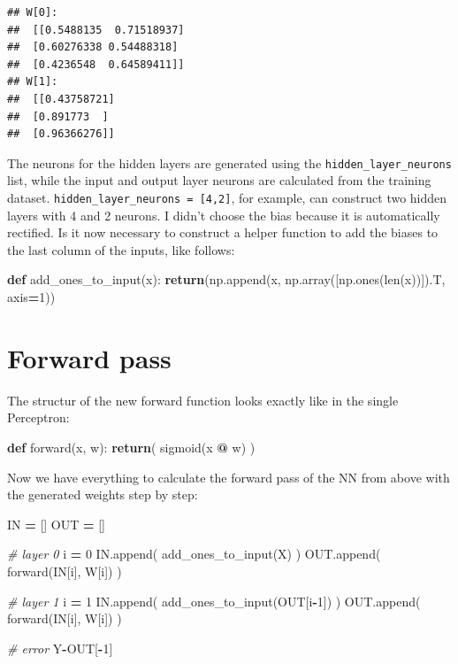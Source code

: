 \documentclass[
]{book}
\newenvironment{Shaded}{\begin{snugshade}}{\end{snugshade}}
\newcommand{\BuiltInTok}[1]{#1}
\newcommand{\CommentTok}[1]{\textcolor[rgb]{0.56,0.35,0.01}{\textit{#1}}}
\newcommand{\ControlFlowTok}[1]{\textcolor[rgb]{0.13,0.29,0.53}{\textbf{#1}}}
\newcommand{\DecValTok}[1]{\textcolor[rgb]{0.00,0.00,0.81}{#1}}
\newcommand{\KeywordTok}[1]{\textcolor[rgb]{0.13,0.29,0.53}{\textbf{#1}}}
\newcommand{\NormalTok}[1]{#1}
\newcommand{\OperatorTok}[1]{\textcolor[rgb]{0.81,0.36,0.00}{\textbf{#1}}}
\begin{document}
\begin{verbatim}
## W[0]: 
##  [[0.5488135  0.71518937]
##  [0.60276338 0.54488318]
##  [0.4236548  0.64589411]]
## W[1]: 
##  [[0.43758721]
##  [0.891773  ]
##  [0.96366276]]
\end{verbatim}

The neurons for the hidden layers are generated using the \texttt{hidden\_layer\_neurons} list, while the input and output layer neurons are calculated from the training dataset. \texttt{hidden\_layer\_neurons\ =\ {[}4,2{]}}, for example, can construct two hidden layers with 4 and 2 neurons. I didn't choose the bias because it is automatically rectified.
Is it now necessary to construct a helper function to add the biases to the last column of the inputs, like follows:

\begin{Shaded}
\begin{Highlighting}[]
\KeywordTok{def}\NormalTok{ add\_ones\_to\_input(x):}
  \ControlFlowTok{return}\NormalTok{(np.append(x, np.array([np.ones(}\BuiltInTok{len}\NormalTok{(x))]).T, axis}\OperatorTok{=}\DecValTok{1}\NormalTok{))}
\end{Highlighting}
\end{Shaded}

\hypertarget{forward-pass-1}{%
\section{Forward pass}\label{forward-pass-1}}

The structur of the new forward function looks exactly like in the single Perceptron:

\begin{Shaded}
\begin{Highlighting}[]
\KeywordTok{def}\NormalTok{ forward(x, w):}
  \ControlFlowTok{return}\NormalTok{( sigmoid(x }\OperatorTok{@}\NormalTok{ w) )}
\end{Highlighting}
\end{Shaded}

Now we have everything to calculate the forward pass of the NN from above with the generated weights step by step:

\begin{Shaded}
\begin{Highlighting}[]
\NormalTok{IN }\OperatorTok{=}\NormalTok{ []}
\NormalTok{OUT }\OperatorTok{=}\NormalTok{ []}

\CommentTok{\# layer 0}
\NormalTok{i }\OperatorTok{=} \DecValTok{0}
\NormalTok{IN.append( add\_ones\_to\_input(X) )}
\NormalTok{OUT.append( forward(IN[i], W[i]) )}

\CommentTok{\# layer 1}
\NormalTok{i }\OperatorTok{=} \DecValTok{1}
\NormalTok{IN.append( add\_ones\_to\_input(OUT[i}\OperatorTok{{-}}\DecValTok{1}\NormalTok{]) )}
\NormalTok{OUT.append( forward(IN[i], W[i]) )}

\CommentTok{\# error}
\NormalTok{Y}\OperatorTok{{-}}\NormalTok{OUT[}\OperatorTok{{-}}\DecValTok{1}\NormalTok{]}
\end{Highlighting}
\end{Shaded}
\end{document}
